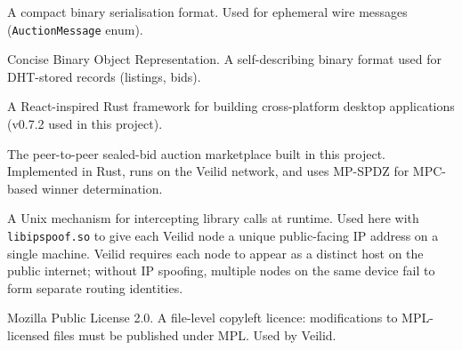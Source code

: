 \begin{description}[style=nextline, labelwidth=5cm, leftmargin=5.5cm]
  \item[Bincode] A compact binary serialisation format. Used for ephemeral wire messages (\texttt{AuctionMessage} enum).
  \item[CBOR] Concise Binary Object Representation. A self-describing binary format used for DHT-stored records (listings, bids).
  \item[Dioxus] A React-inspired Rust framework for building cross-platform desktop applications (v0.7.2 used in this project).
  \item[Lattice] The peer-to-peer sealed-bid auction marketplace built in this project. Implemented in Rust, runs on the Veilid network, and uses MP-SPDZ for MPC-based winner determination.
  \item[LD\_PRELOAD] A Unix mechanism for intercepting library calls at runtime. Used here with \texttt{libipspoof.so} to give each Veilid node a unique public-facing IP address on a single machine. Veilid requires each node to appear as a distinct host on the public internet; without IP spoofing, multiple nodes on the same device fail to form separate routing identities.
  \item[MPL-2.0] Mozilla Public License 2.0. A file-level copyleft licence: modifications to MPL-licensed files must be published under MPL. Used by Veilid.

\end{description}
